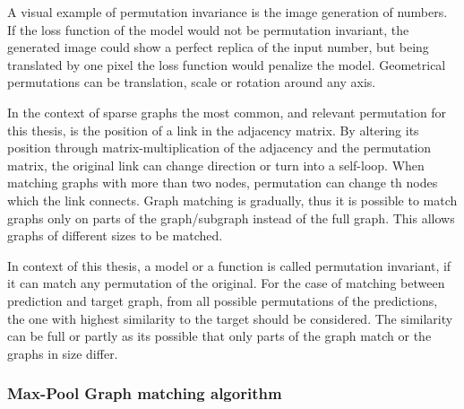 {%
A visual example of permutation invariance is the image generation of numbers. If the loss function of the model would not be permutation invariant, the generated image could show a perfect replica of the input number, but being translated by one pixel the loss function would penalize the model. Geometrical permutations can be translation, scale or rotation around any axis. 

In the context of sparse graphs the most common, and relevant permutation for this thesis, is the position of a link in the adjacency matrix. By altering its position through matrix-multiplication of the adjacency and the permutation matrix, the original link can change direction or turn into a self-loop. When matching graphs with more than two nodes, permutation can change th nodes which the link connects. Graph matching is gradually, thus it is possible to match graphs only on parts of the graph/subgraph instead of the full graph. This allows graphs of different sizes to be matched. 

In context of this thesis, a model or a function is called permutation invariant, if it can match any permutation of the original. For the case of matching between prediction and target graph, from all possible permutations of the predictions, the one with highest similarity to the target should be considered. The similarity can be full or partly as its possible that only parts of the graph match or the graphs in size differ.  



\subsubsection{Max-Pool Graph matching algorithm}


}
